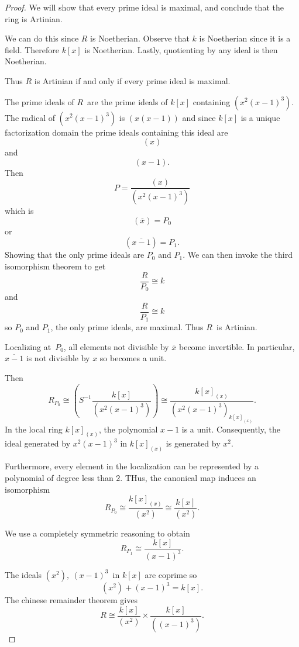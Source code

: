 \documentclass[11pt]{article}
\begin{document}
\begin{proof}
    We will show that every prime ideal is 
    maximal, and conclude that the 
    ring is Artinian. 

    We can do this since $R$ is Noetherian. 
    Observe that $k$ is Noetherian since it is a field. 
    Therefore $k[x]$ is Noetherian. Lastly, 
    quotienting by any ideal is 
    then Noetherian. 

    Thus $R$ is Artinian if and only if 
    every prime ideal is maximal. 

    The prime ideals of $R$ are the prime ideals 
    of $k[x]$ containing $(x^2(x-1)^3)$. 
    The radical of $(x^2(x-1)^3)$ is 
    $(x(x-1))$ and since $k[x]$ is a unique factorization 
    domain the prime ideals 
    containing this ideal are 
    \[
        (x)
    \]
    and 
    \[
        (x-1). 
    \]
    Then 
    \[
        P = \frac{(x)}{(x^2(x-1)^3)}
    \]
    which is 
    \[
        (\overline x) = P_0
    \]
    or 
    \[
        (\overline{x-1}) = P_1. 
    \]
    Showing that the only prime ideals are $P_0$ and $P_1$. 
    We can then invoke the third isomorphism theorem to get 
    \[
        \frac{R}{P_0} \cong k 
    \]
    and 
    \[
        \frac{R}{P_1} \cong k  
    \]
    so $P_0$ and $P_1$, the only prime ideals, 
    are maximal. Thus $R$ is Artinian. 

    Localizing at $P_0$, all 
    elements not divisible by $\overline{x}$ become invertible. 
    In particular, $\overline{x-1}$ is not divisible by 
    $x$ so becomes a unit. 

    Then 
    \[
        R_{P_0} \cong 
        \left(S^{-1}\frac{k[x]}{(x^2(x-1)^3)}\right)
        \cong \frac{k[x]_{(x)}}{(x^2(x-1)^3)_{k[x]_{(x)}}}. 
    \]
    In the local ring $k[x]_{(x)}$, the polynomial 
    $x-1$ is a unit. Consequently, the ideal generated by 
    $x^2(x-1)^3$ in $k[x]_{(x)}$ is generated by $x^2$. 

    Furthermore, every element in the localization can 
    be represented by a polynomial of degree less than $2$. 
    THus, the canonical map induces an isomorphism 
    \[
        R_{P_0} \cong \frac{k[x]_{(x)}}{(x^2)} \cong 
        \frac{k[x]}{(x^2)}.
    \]

    We use a completely symmetric reasoning to obtain 
    \[
        R_{P_1} \cong \frac{k[x]}{(x-1)^3}. 
    \]

    The ideals $(x^2), \ (x-1)^3$ in $k[x]$ are coprime so 
    \[
        (x^2) + (x-1)^3 = k[x].
    \]
    The chinese remainder theorem gives 
    \[
        R \cong \frac{k[x]}{(x^2)} \times \frac{k[x]}{((x-1)^3)}.
    \]
    
\end{proof}
\end{document}
